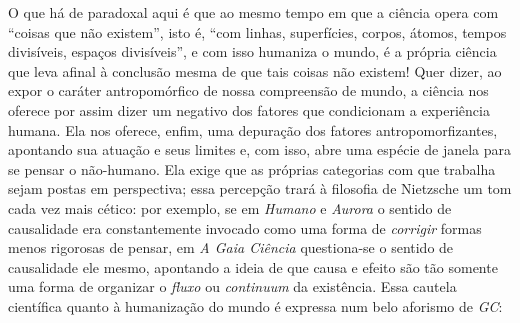 \documentclass[
	12pt,				%
	openright,			%
	oneside,			%
	a4paper,			%
	english,			%
	french,				%
	spanish,			%
	brazil				%
	]{abntex2}
\begin{document}
O que há de paradoxal aqui é que ao mesmo tempo em que a ciência opera com “coisas que não existem”, isto é, “com linhas, superfícies, corpos, átomos, tempos divisíveis, espaços divisíveis”, e com isso humaniza o mundo, é a própria ciência que leva afinal à conclusão mesma de que tais coisas não existem! Quer dizer, ao expor o caráter antropomórfico de nossa compreensão de mundo, a ciência nos oferece por assim dizer um negativo dos fatores que condicionam a experiência humana. Ela nos oferece, enfim, uma depuração dos fatores antropomorfizantes, apontando sua atuação e seus limites e, com isso, abre uma espécie de janela para se pensar o não-humano. Ela exige que as próprias categorias com que trabalha sejam postas em perspectiva; essa percepção trará à filosofia de Nietzsche um tom cada vez mais cético: por exemplo, se em \textit{Humano} e \textit{Aurora} o sentido de causalidade era constantemente invocado como uma forma de \textit{corrigir} formas menos rigorosas de pensar, em \textit{A Gaia Ciência} questiona-se o sentido de causalidade ele mesmo, apontando a ideia de que causa e efeito são tão somente uma forma de organizar o \textit{fluxo} ou \textit{continuum} da existência. Essa cautela científica quanto à humanização do mundo é expressa num belo aforismo de \textit{GC}:
\end{document}
